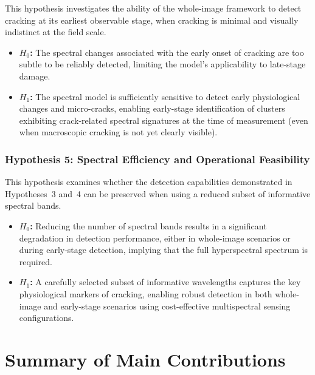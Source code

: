 \noindent
This hypothesis investigates the ability of the whole-image framework to detect cracking at its earliest observable stage, when cracking is minimal and visually indistinct at the field scale.

\begin{itemize}
    \item \textbf{$H_0$:} The spectral changes associated with the early onset of cracking are too subtle to be reliably detected, limiting the model's applicability to late-stage damage.
    \item \textbf{$H_1$:} The spectral model is sufficiently sensitive to detect early physiological changes and micro-cracks, enabling early-stage identification of clusters exhibiting crack-related spectral signatures at the time of measurement (even when macroscopic cracking is not yet clearly visible).
\end{itemize}

\subsubsection{Hypothesis 5: Spectral Efficiency and Operational Feasibility}
\label{hyp:spectral_efficiency}

\noindent
This hypothesis examines whether the detection capabilities demonstrated in Hypotheses~3 and~4 can be preserved when using a reduced subset of informative spectral bands.

\begin{itemize}
    \item \textbf{$H_0$:} Reducing the number of spectral bands results in a significant degradation in detection performance, either in whole-image scenarios or during early-stage detection, implying that the full hyperspectral spectrum is required.
    \item \textbf{$H_1$:} A carefully selected subset of informative wavelengths captures the key physiological markers of cracking, enabling robust detection in both whole-image and early-stage scenarios using cost-effective multispectral sensing configurations.
\end{itemize}

\section{Summary of Main Contributions}

